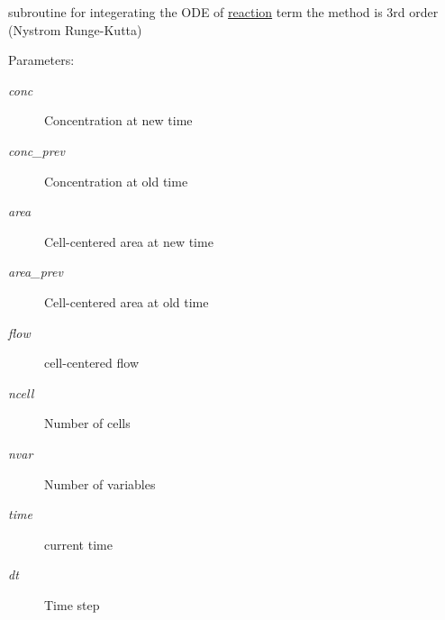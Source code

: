 subroutine for integerating the ODE of \hyperlink{a00068}{reaction} term the method is 3rd order (Nystrom Runge-Kutta) 

\begin{Desc}
\item[Parameters:]
\begin{description}
\item[{\em conc}]Concentration at new time\item[{\em conc\_\-prev}]Concentration at old time\item[{\em area}]Cell-centered area at new time\item[{\em area\_\-prev}]Cell-centered area at old time\item[{\em flow}]cell-centered flow \item[{\em ncell}]Number of cells\item[{\em nvar}]Number of variables\item[{\em time}]current time\item[{\em dt}]Time step \end{description}
\end{Desc}
